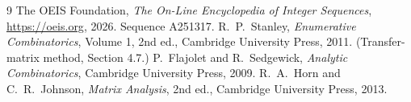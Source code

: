 \documentclass[11pt,a4paper]{article}
\theoremstyle{plain}
\theoremstyle{definition}
\begin{document}
\begin{thebibliography}{9}
 The OEIS Foundation, \emph{The On-Line Encyclopedia of Integer
Sequences}, \url{https://oeis.org}, 2026. Sequence A251317.
 R.~P.~Stanley, \emph{Enumerative Combinatorics}, Volume 1, 2nd ed.,
Cambridge University Press, 2011. (Transfer-matrix method, Section 4.7.)
 P.~Flajolet and R.~Sedgewick, \emph{Analytic Combinatorics}, Cambridge
University Press, 2009.
 R.~A.~Horn and C.~R.~Johnson, \emph{Matrix Analysis}, 2nd ed., Cambridge
University Press, 2013.
\end{thebibliography}
\end{document}
